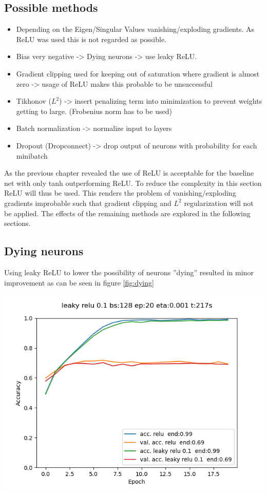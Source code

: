 \documentclass{article}
\newenvironment{Figure}
{\par\medskip\noindent\minipage{\linewidth}}
{\endminipage\par\medskip}
\begin{document}
\begin{multicols}{2}
\subsection{Possible methods}
\begin{itemize}
	\item Depending on the Eigen/Singular Values vanishing/exploding gradients. As ReLU was used this is not regarded as possible.
	\item Bias very negative -> Dying neurons -> use leaky ReLU.
	\item Gradient clipping used for keeping out of saturation where gradient is almost zero -> usage of ReLU makes this probable to be unsuccessful
	\item Tikhonov ($L^{2}$) -> insert penalizing term into minimization to prevent weights getting to large. (Frobenius norm has to be used)
	\item Batch normalization -> normalize input to layers
	\item Dropout (Dropconnect) -> drop output of neurons with probability for each minibatch
\end{itemize}
As the previous chapter revealed the use of ReLU is acceptable for the baseline net with only tanh outperforming ReLU. To reduce the complexity in this section ReLU will thus be used. This renders the problem of vanishing/exploding gradients improbable such that gradient clipping and $L^{2}$ regularization will not be applied. The effects of the remaining methods are explored in the following sections.

\subsection{Dying neurons}
Using leaky ReLU to lower the possibility of neurons ''dying'' resulted in minor improvement as can be seen in figure \ref{fig:dying}
\begin{Figure}
	\label{fig:dying}
	\centering
	\includegraphics[width=\linewidth]{../img_1_5_regularization/dying}
\end{Figure}


\end{multicols}
\end{document}
